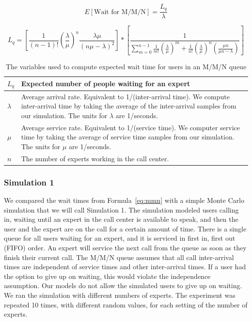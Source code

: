 \begin{equation}
  E[\text{Wait for M/M/N}] = \frac{L_q}{\lambda}
  \label{eq:mmn}
\end{equation}

\begin{equation}
  L_q = \left[ \frac{1}{(n - 1)!} \left( \frac{\lambda}{\mu} \right)^n
    \frac{\lambda \mu}{(n \mu - \lambda)^2} \right] *
  \left[ \frac{1}{\sum_{m=0}^{n-1} \frac{1}{m!} \left( \frac{\lambda}{\mu}
      \right)^m + \frac{1}{n!} \left( \frac{\lambda}{\mu} \right)^n
    \left( \frac{\mu n}{\mu n - \lambda} \right) } \right]
\label{eq:num_waiting}
\end{equation}

\begin{table}[h]
  \begin{tabular}{|l|p{5.8in}|}
    \hline
    $L_q$ & Expected number of people waiting for an expert\\
    \hline
    $\lambda$ & Average arrival rate. Equivalent to 1/(inter-arrival time).
                We compute inter-arrival time by taking the average of the
                inter-arrival samples from our simulation.
                The units for $\lambda$ are 1/seconds.\\
    \hline
    $\mu$ & Average service rate. Equivalent to 1/(service time).
            We computer service time by taking the average of service time
            samples from our simulation.
            The units for $\mu$ are 1/seconds.\\
    \hline
    $n$ & The number of experts working in the call center.\\
    \hline
  \end{tabular}
  \caption{The variables used to compute expected wait time for users in an
    M/M/N queue}\label{tab:vars}
\end{table}

\pagebreak

\subsubsection{Simulation 1}

We compared the wait times from Formula~\ref{eq:mmn} with a simple Monte Carlo
simulation that we will call Simulation 1.
The simulation modeled users calling in, waiting until an expert in the
call center is available to speak, and then the user and the expert are on the
call for a certain amount of time.
There is a single queue for all users waiting for an expert, and it is serviced
in first in, first out (FIFO) order.
An expert will service the next call from the queue as soon as they finish their
current call.
The M/M/N queue assumes that all call inter-arrival times are independent of
service times and other inter-arrival times.
If a user had the option to give up on waiting, this would violate the
independence assumption.
Our models do not allow the simulated users to give up on waiting.
We ran the simulation with different numbers of experts.
The experiment was repeated 10 times, with different random values, for each
setting of the number of experts.

